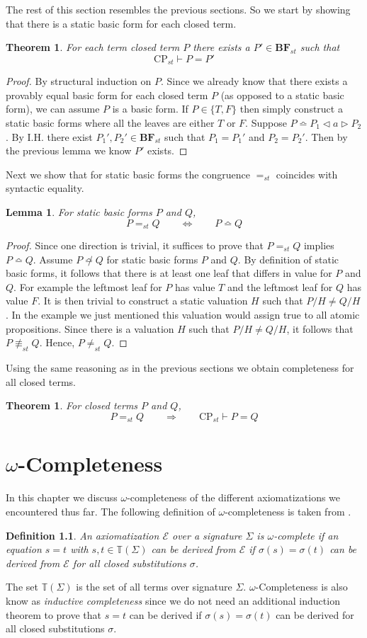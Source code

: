 \documentclass[a4paper,twoside,openright]{report}
\newcommand{\BF}{\ensuremath{\textbf{BF}}}
\newcommand{\syn}{\bumpeq}
\newcommand{\nsyn}{\not\bumpeq}
\newcommand{\lef}{\ensuremath{\triangleleft}}
\newcommand{\rig}{\ensuremath{\triangleright}}
\newtheorem{lem}[theorem]{Lemma}
\newtheorem{thm}[theorem]{Theorem}
\newtheorem{defn}[theorem]{Definition}
\begin{document}
The rest of this section resembles the previous sections. So we start by showing that there is a static basic form for each closed term.
\begin{thm}
For each term closed term $P$ there exists a $P'\in\BF_{st}$ such
that 
\[
\text{CP}_{st}\vdash P=P'
\]
\end{thm}
\begin{proof}
By structural induction on $P$. Since we already know that there exists a provably equal basic form for each closed term $P$ (as opposed to a static basic form), we can assume $P$ is a basic form. If $P\in\{T,F\}$ then simply construct a static basic forms where all the leaves are either $T$ or $F$.
Suppose $P\syn P_1\lef a\rig P_2$. By I.H. there exist $P_1',P_2'\in\BF_{st}$ such that $P_1=P_1'$ and $P_2=P_2'$. Then by the previous lemma we know $P'$ exists.
\end{proof}
Next we show that for static basic forms the congruence $=_{st}$ coincides with syntactic equality.
\begin{lem}
For static basic forms $P$ and $Q$,
\[
P=_{st}Q\qquad\Longleftrightarrow\qquad P\syn Q
\]
\end{lem}
\begin{proof}
Since one direction is trivial, it suffices to prove that $P=_{st}Q$ implies $P\syn Q$. Assume $P\nsyn Q$ for static basic forms $P$ and $Q$. By definition of static basic forms, it follows that there is at least one leaf that differs in value for $P$ and $Q$. For example the leftmost leaf for $P$ has value $T$ and the leftmost leaf for $Q$ has value $F$. It is then trivial to construct a static valuation $H$ such that $P/H\ne Q/H$. In the example we just mentioned this valuation would assign true to all atomic propositions. Since there is a valuation $H$ such that $P/H\ne Q/H$, it follows that $P\not\equiv_{st}Q$. Hence, $P\ne_{st} Q$.
\end{proof}
Using the same reasoning as in the previous sections we obtain completeness for all closed terms.
\begin{thm}
For closed terms $P$ and $Q$,
\[
P=_{st}Q\qquad\Longrightarrow\qquad \text{CP}_{st}\vdash P=Q
\]
\end{thm}

\chapter{$\omega$-Completeness}
In this chapter we discuss $\omega$-completeness of the different axiomatizations we encountered thus far. The following definition of $\omega$-completeness is taken from \cite{fokkink}.
\begin{defn}
An axiomatization $\mathcal{E}$ over a signature $\Sigma$ is $\omega$-complete if an equation $s=t$ with $s,t\in\mathbb{T}(\Sigma)$ can be derived from $\mathcal{E}$ if $\sigma(s)=\sigma(t)$ can be derived from $\mathcal{E}$ for all closed substitutions $\sigma$.
\end{defn}
The set $\mathbb{T}(\Sigma)$ is the set of all terms over signature $\Sigma$. $\omega$-Completeness is also know as \emph{inductive completeness} since we do not need an additional induction theorem to prove that $s=t$ can be derived if $\sigma(s)=\sigma(t)$ can be derived for all closed substitutions $\sigma$.
\end{document}
